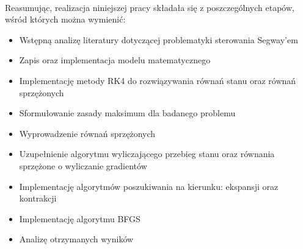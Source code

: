 \paragraph*{}
Reasumując, realizacja niniejszej pracy składała się z poszczególnych etapów, wśród których można wymienić:
\begin{itemize}
\item Wstępną analizę literatury dotyczącej problematyki sterowania Segway'em
\item Zapis oraz implementacja modelu matematycznego
\item Implementację metody RK4 do rozwiązywania równań stanu oraz równań sprzężonych
\item Sformułowanie zasady maksimum dla badanego problemu
\item Wyprowadzenie równań sprzężonych
\item Uzupełnienie algorytmu wyliczającego przebieg stanu oraz równania sprzężone o wyliczanie gradientów
\item Implementację algorytmów poszukiwania na kierunku: ekspansji oraz kontrakcji
\item Implementację algorytmu BFGS
\item Analizę otrzymanych wyników
\end{itemize}




